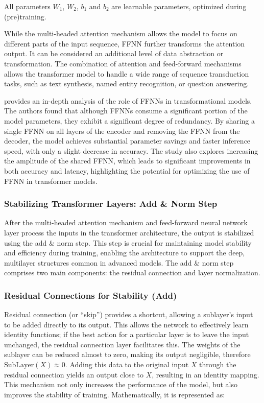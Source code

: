 All parameters \( W_1 \), \( W_2 \), \( b_1 \) and \( b_2 \) are learnable parameters, optimized during (pre)training.

While the multi-headed attention mechanism allows the model to focus on different parts of the input sequence, FFNN further transforms the attention output. It can be considered an additional level of data abstraction or transformation. The combination of attention and feed-forward mechanisms allows the transformer model to handle a wide range of sequence transduction tasks, such as text synthesis, named entity recognition, or question answering.

\cite{pires2023one} provides an in-depth analysis of the role of FFNNs in transformational models. The authors found that although FFNNs consume a significant portion of the model parameters, they exhibit a significant degree of redundancy. By sharing a single FFNN on all layers of the encoder and removing the FFNN from the decoder, the model achieves substantial parameter savings and faster inference speed, with only a slight decrease in accuracy. The study also explores increasing the amplitude of the shared FFNN, which leads to significant improvements in both accuracy and latency, highlighting the potential for optimizing the use of FFNN in transformer models.

\subsubsection{Stabilizing Transformer Layers: Add \& Norm Step}

After the multi-headed attention mechanism and feed-forward neural network layer process the inputs in the transformer architecture, the output is stabilized using the add \& norm step. This step is crucial for maintaining model stability and efficiency during training, enabling the architecture to support the deep, multilayer structures common in advanced models. The add \& norm step comprises two main components: the residual connection and layer normalization.

\subsubsection{Residual Connections for Stability (Add)}

Residual connection (or “skip”) provides a shortcut, allowing a sublayer's input to be added directly to its output. This allows the network to effectively learn identity functions; if the best action for a particular layer is to leave the input unchanged, the residual connection layer facilitates this. The weights of the sublayer can be reduced almost to zero, making its output negligible, therefore \(\text{SubLayer}(X) \approx 0\). Adding this data to the original input \(X\) through the residual connection yields an output close to \(X\), resulting in an identity mapping. This mechanism not only increases the performance of the model, but also improves the stability of training. Mathematically, it is represented as:

